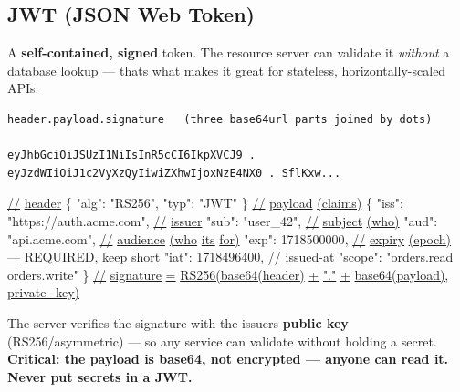 \documentclass[11pt]{article}
\newenvironment{Shaded}{\begin{snugshade}}{\end{snugshade}}
\newcommand{\DataTypeTok}[1]{\textcolor[rgb]{0.16,0.50,0.73}{#1}}
\newcommand{\DecValTok}[1]{\textcolor[rgb]{0.96,0.45,0.00}{#1}}
\newcommand{\ErrorTok}[1]{\textcolor[rgb]{0.85,0.27,0.33}{\underline{#1}}}
\newcommand{\FunctionTok}[1]{\textcolor[rgb]{0.56,0.27,0.68}{#1}}
\newcommand{\StringTok}[1]{\textcolor[rgb]{0.96,0.31,0.31}{#1}}
\begin{document}
\subsection{JWT (JSON Web Token)}\label{jwt-json-web-token}

A \textbf{self-contained, signed} token. The resource server can validate it \emph{without} a database lookup --- that\textquotesingle s what makes it great for stateless, horizontally-scaled APIs.

\setcodelang{}

\begin{verbatim}
header.payload.signature   (three base64url parts joined by dots)

eyJhbGciOiJSUzI1NiIsInR5cCI6IkpXVCJ9 . eyJzdWIiOiJ1c2VyXzQyIiwiZXhwIjoxNzE4NX0 . SflKxw...
\end{verbatim}


\begin{Shaded}
\begin{Highlighting}[]
\ErrorTok{//} \ErrorTok{header}
\FunctionTok{\{} \DataTypeTok{"alg"}\FunctionTok{:} \StringTok{"RS256"}\FunctionTok{,} \DataTypeTok{"typ"}\FunctionTok{:} \StringTok{"JWT"} \FunctionTok{\}}
\ErrorTok{//} \ErrorTok{payload} \ErrorTok{(claims)}
\FunctionTok{\{}
  \DataTypeTok{"iss"}\FunctionTok{:} \StringTok{"https://auth.acme.com"}\FunctionTok{,}   \ErrorTok{//} \ErrorTok{issuer}
  \DataTypeTok{"sub"}\FunctionTok{:} \StringTok{"user\_42"}\FunctionTok{,}                  \ErrorTok{//} \ErrorTok{subject} \ErrorTok{(who)}
  \DataTypeTok{"aud"}\FunctionTok{:} \StringTok{"api.acme.com"}\FunctionTok{,}             \ErrorTok{//} \ErrorTok{audience} \ErrorTok{(who} \ErrorTok{it\textquotesingle{}s} \ErrorTok{for)}
  \DataTypeTok{"exp"}\FunctionTok{:} \DecValTok{1718500000}\FunctionTok{,}                 \ErrorTok{//} \ErrorTok{expiry} \ErrorTok{(epoch)} \ErrorTok{—} \ErrorTok{REQUIRED}\FunctionTok{,} \ErrorTok{keep} \ErrorTok{short}
  \DataTypeTok{"iat"}\FunctionTok{:} \DecValTok{1718496400}\FunctionTok{,}                 \ErrorTok{//} \ErrorTok{issued{-}at}
  \DataTypeTok{"scope"}\FunctionTok{:} \StringTok{"orders.read orders.write"}
\FunctionTok{\}}
\ErrorTok{//} \ErrorTok{signature} \ErrorTok{=} \ErrorTok{RS256(base64(header)} \ErrorTok{+} \ErrorTok{"."} \ErrorTok{+} \ErrorTok{base64(payload),} \ErrorTok{private\_key)}
\end{Highlighting}
\end{Shaded}

The server verifies the signature with the issuer\textquotesingle s \textbf{public key} (RS256/asymmetric) --- so any service can validate without holding a secret. \textbf{Critical: the payload is base64, not encrypted --- anyone can read it. Never put secrets in a JWT.}
\end{document}
